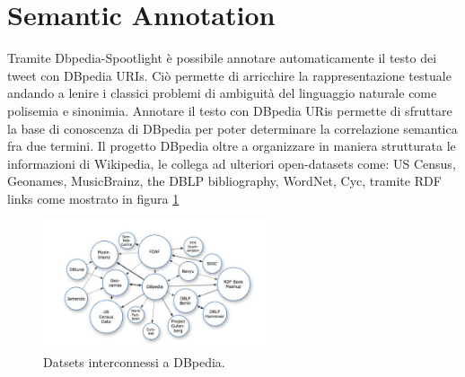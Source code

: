\documentclass[a4paper,12pt]{report}
\begin{document}
\section{Semantic Annotation}
Tramite Dbpedia-Spootlight \cite{isem2013daiber} è possibile annotare automaticamente il testo dei tweet con DBpedia URIs.  Ciò permette di arricchire la rappresentazione testuale andando a lenire i classici problemi di ambiguità del linguaggio naturale come polisemia e sinonimia.  
Annotare il testo con DBpedia URis permette di sfruttare la base di conoscenza di DBpedia per poter determinare la correlazione semantica fra due termini. 
Il progetto DBpedia \cite{DBLP:conf/semweb/AuerBKLCI07} oltre a organizzare in maniera strutturata le informazioni di Wikipedia, le collega ad ulteriori open-datasets come: US Census, Geonames, MusicBrainz, the DBLP bibliography, WordNet, Cyc, tramite RDF links come mostrato in figura \ref{fig:dbpedia}  
\begin{figure}[h]
    \centering
    \includegraphics[width=0.6\textwidth]{dbpedia}
    \caption{Datsets interconnessi a DBpedia.}
    \label{fig:dbpedia}
\end{figure}  
\end{document}
